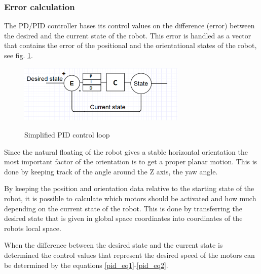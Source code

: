 \subsubsection*{Error calculation}
\noindent 
The PD/PID controller bases its control values on the difference (error) between the desired and the current state of the robot. This error is handled as a vector that contains the error of the positional and the orientational states of the robot, see fig. \ref{pid_pic}. 


\begin{figure}[!ht]
\begin{center}
\includegraphics[width=80mm]{./Images/Software/simplepid.png}
\\
\caption{\label{pid_pic}Simplified PID control loop}
\end{center}
\end{figure}


Since the natural floating of the robot gives a stable horizontal orientation the most important factor of the orientation is to get a proper planar motion. This is done by keeping track of the angle around the Z axis, the yaw angle.

By keeping the position and orientation data relative to the starting state of the robot, it is possible to calculate which motors should be activated and how much depending on the current state of the robot. This is done by transferring the desired state that is given in global space coordinates into coordinates of the robots local space.

When the difference between the desired state and the current state is determined the control values that represent the desired speed of the motors can be determined by the equations \ref{pid_eq1}-\ref{pid_eq2}.

